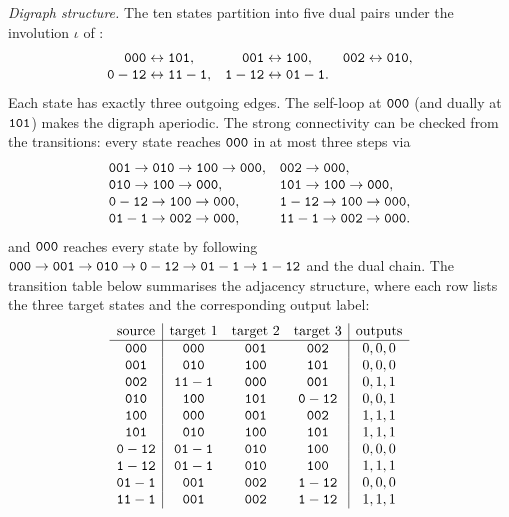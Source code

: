\begin{definition}
\medskip
\noindent\textit{Digraph structure.}\quad
The ten states partition into five dual pairs under the involution
\(\iota\) of :
\[
  \begin{array}{ccc}
  \mathtt{000}\leftrightarrow\mathtt{101},&
  \mathtt{001}\leftrightarrow\mathtt{100},&
  \mathtt{002}\leftrightarrow\mathtt{010},\\
  \mathtt{0-12}\leftrightarrow\mathtt{11-1},&
  \mathtt{1-12}\leftrightarrow\mathtt{01-1}.&
  \end{array}
\]
Each state has exactly three outgoing edges. The self-loop at
\(\mathtt{000}\) (and dually at \(\mathtt{101}\)) makes the digraph aperiodic.
The strong connectivity can be checked from the transitions: every state
reaches \(\mathtt{000}\) in at most three steps via
\[
  \begin{array}{ll}
  \mathtt{001}\to\mathtt{010}\to\mathtt{100}\to\mathtt{000},&
  \mathtt{002}\to\mathtt{000},\\
  \mathtt{010}\to\mathtt{100}\to\mathtt{000},&
  \mathtt{101}\to\mathtt{100}\to\mathtt{000},\\
  \mathtt{0-12}\to\mathtt{100}\to\mathtt{000},&
  \mathtt{1-12}\to\mathtt{100}\to\mathtt{000},\\
  \mathtt{01-1}\to\mathtt{002}\to\mathtt{000},&
  \mathtt{11-1}\to\mathtt{002}\to\mathtt{000}.
  \end{array}
\]
and \(\mathtt{000}\) reaches every state by following
\(\mathtt{000}\to\mathtt{001}\to\mathtt{010}\to\mathtt{0-12}\to\mathtt{01-1}\to\mathtt{1-12}\)
and the dual chain. The transition table below summarises the adjacency
structure, where each row lists the three target states and the
corresponding output label:
\[
  \begin{array}{c|ccc|c}
    \text{source} & \text{target 1} & \text{target 2} & \text{target 3}
      & \text{outputs} \\
    \hline
    \mathtt{000} & \mathtt{000} & \mathtt{001} & \mathtt{002} & 0,0,0 \\
    \mathtt{001} & \mathtt{010} & \mathtt{100} & \mathtt{101} & 0,0,0 \\
    \mathtt{002} & \mathtt{11-1} & \mathtt{000} & \mathtt{001} & 0,1,1 \\
    \mathtt{010} & \mathtt{100} & \mathtt{101} & \mathtt{0-12} & 0,0,1 \\
    \mathtt{100} & \mathtt{000} & \mathtt{001} & \mathtt{002} & 1,1,1 \\
    \mathtt{101} & \mathtt{010} & \mathtt{100} & \mathtt{101} & 1,1,1 \\
    \mathtt{0-12} & \mathtt{01-1} & \mathtt{010} & \mathtt{100} & 0,0,0 \\
    \mathtt{1-12} & \mathtt{01-1} & \mathtt{010} & \mathtt{100} & 1,1,1 \\
    \mathtt{01-1} & \mathtt{001} & \mathtt{002} & \mathtt{1-12} & 0,0,0 \\
    \mathtt{11-1} & \mathtt{001} & \mathtt{002} & \mathtt{1-12} & 1,1,1 \\
  \end{array}
\]
\end{definition}


